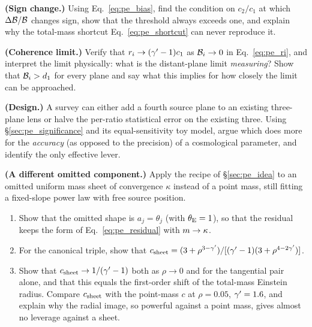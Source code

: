 \begin{exercise}
\label{ex:pe_sign_change}
\textbf{(Sign change.)}
Using Eq.~\eqref{eq:pe_bias}, find the condition on $c_2/c_1$ at which
$\Delta\mathcal{B}/\mathcal{B}$ changes sign, show that the threshold always exceeds
one, and explain why the total-mass shortcut
Eq.~\eqref{eq:pe_shortcut} can never reproduce it.
\end{exercise}

\begin{exercise}
\label{ex:pe_coherence_limit}
\textbf{(Coherence limit.)}
Verify that $r_i\to(\gamma'-1)c_1$ as $\mathcal{B}_i\to0$ in Eq.~\eqref{eq:pe_ri},
and interpret the limit physically: what is the distant-plane limit
\emph{measuring}? Show that $\mathcal{B}_i>d_1$ for every plane and say what
this implies for how closely the limit can be approached.
\end{exercise}

\begin{exercise}
\label{ex:pe_design}
\textbf{(Design.)}
A survey can either add a fourth source plane to an existing three-plane
lens or halve the per-ratio statistical error on the existing three.
Using \S\ref{sec:pe_significance} and its equal-sensitivity toy model,
argue which does more for the \emph{accuracy} (as opposed to the
precision) of a cosmological parameter, and identify the only effective
lever.
\end{exercise}

\begin{exercise}
\label{ex:pe_mass_sheet}
\textbf{(A different omitted component.)}
Apply the recipe of \S\ref{sec:pe_idea} to an omitted uniform mass
sheet of convergence $\kappa$ instead of a point mass, still fitting a
fixed-slope power law with free source position.
\begin{enumerate}[label=(\alph*)]
    \item Show that the omitted shape is $a_j=\theta_j$ (with
          $\theta_{\mathrm{E}}=1$), so that the residual keeps the form of
          Eq.~\eqref{eq:pe_residual} with $m\to\kappa$.
    \item For the canonical triple, show that
          $c_{\rm sheet}=(3+\rho^{3-\gamma'})/[(\gamma'-1)(3+\rho^{4-2\gamma'})]$.
    \item Show that $c_{\rm sheet}\to1/(\gamma'-1)$ both as $\rho\to0$ and
          for the tangential pair alone, and that this equals the
          first-order shift of the total-mass Einstein radius. Compare
          $c_{\rm sheet}$ with the point-mass $c$ at $\rho=0.05$,
          $\gamma'=1.6$, and explain why the radial image, so powerful
          against a point mass, gives almost no leverage against a
          sheet.
\end{enumerate}
\end{exercise}
